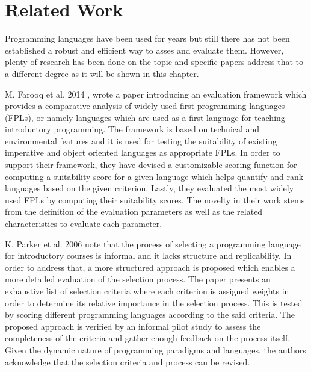 \chapter{Related Work}
\label{chap:related_work}

Programming languages have been used for years but still there has not been established a robust and efficient way to asses and evaluate them. However, plenty of research has been done on the topic and specific papers address that to a different degree as it will be shown in this chapter.

M. Farooq et al. 2014 \cite{FPLEvalFramework}, wrote a paper introducing an evaluation framework which provides a comparative analysis of widely used first programming languages (FPLs), or namely languages which are used as a first language for teaching introductory programming. The framework is based on technical and environmental features and it is used for testing the suitability of existing imperative and object oriented languages as appropriate FPLs. In order to support their framework, they have devised a customizable scoring function for computing a  suitability score for a given language which helps quantify and rank languages based on the given criterion. Lastly, they evaluated the most widely used FPLs by computing their suitability scores. The novelty in their work stems from the definition of the evaluation parameters as well as the related characteristics to evaluate each parameter.

K. Parker et al. 2006 \cite{LangSelectionProcess} note that the process of selecting a programming language for introductory courses is informal and it lacks structure and replicability. In order to address that, a more structured approach is proposed which enables a more detailed evaluation of the selection process. The paper presents an exhaustive list of selection criteria  where each criterion is assigned weights in order to determine its relative importance in the selection process. This is tested by scoring different programming languages according to the said criteria. The proposed approach is verified by an informal pilot study to assess the completeness of the criteria and gather enough feedback on the process itself. Given the dynamic nature of programming paradigms and languages, the authors acknowledge that the selection criteria and process can be revised.

